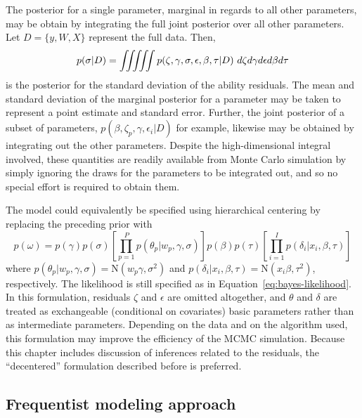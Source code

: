 \documentclass[12pt, letterpaper]{article}
\begin{document}
The posterior for a single parameter, marginal in regards to all other parameters, may be obtain by integrating the full joint posterior over all other parameters. Let $D = \{ y, W, X \}$ represent the full data. Then,
\begin{equation}
	p(\sigma | D) =
	\iiiiint
		p(\zeta, \gamma, \sigma, \epsilon, \beta, \tau | D)
	~d \zeta d \gamma d \epsilon d \beta d \tau
\end{equation}
is the posterior for the standard deviation of the ability residuals. The mean and standard deviation of the marginal posterior for a parameter may be taken to represent a point estimate and standard error. Further, the joint posterior of a subset of parameters, $p(\beta, \zeta_p, \gamma, \epsilon_i | D)$ for example, likewise may be obtained by integrating out the other parameters. Despite the high-dimensional integral involved, these quantities are readily available from Monte Carlo simulation by simply ignoring the draws for the parameters to be integrated out, and so no special effort is required to obtain them.

The model could equivalently be specified using hierarchical centering \parencite{gelfand1995efficient} by replacing the preceding prior with
\begin{equation}
	p(\omega) =
	p(\gamma) p(\sigma)
	\left [
		\prod_{p=1}^P p(\theta_p | w_p, \gamma, \sigma)
	\right ]
	p(\beta) 	p(\tau)
	\left [
		\prod_{i=1}^I p(\delta_i | x_i, \beta, \tau)
	\right ]
\end{equation}
where
$p(\theta_p | w_p, \gamma, \sigma) = \mathrm{N}(w_p \gamma, \sigma^2)$ and
$p(\delta_i | x_i, \beta, \tau)    = \mathrm{N}(x_i \beta, \tau^2)$,
respectively. The likelihood is still specified as in Equation~\ref{eq:bayes-likelihood}. In this formulation, residuals $\zeta$ and $\epsilon$ are omitted altogether, and $\theta$ and $\delta$ are treated as exchangeable (conditional on covariates) basic parameters rather than as intermediate parameters. Depending on the data and on the algorithm used, this formulation may improve the efficiency of the MCMC simulation. Because this chapter includes discussion of inferences related to the residuals, the ``decentered'' formulation described before is preferred.


\subsection{Frequentist modeling approach}
\end{document}
